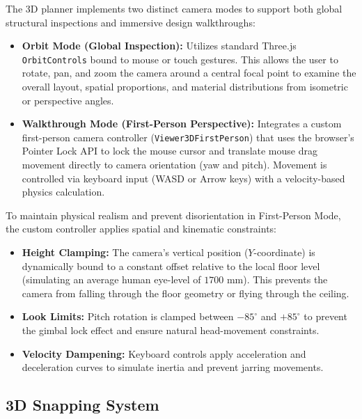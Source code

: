 The 3D planner implements two distinct camera modes to support both global structural inspections and immersive design walkthroughs:
\begin{itemize}
    \item \textbf{Orbit Mode (Global Inspection):} Utilizes standard Three.js \texttt{OrbitControls} bound to mouse or touch gestures. This allows the user to rotate, pan, and zoom the camera around a central focal point to examine the overall layout, spatial proportions, and material distributions from isometric or perspective angles.
    \item \textbf{Walkthrough Mode (First-Person Perspective):} Integrates a custom first-person camera controller (\texttt{Viewer3DFirstPerson}) that uses the browser's Pointer Lock API to lock the mouse cursor and translate mouse drag movement directly to camera orientation (yaw and pitch). Movement is controlled via keyboard input (WASD or Arrow keys) with a velocity-based physics calculation.
\end{itemize}

To maintain physical realism and prevent disorientation in First-Person Mode, the custom controller applies spatial and kinematic constraints:
\begin{itemize}
    \item \textbf{Height Clamping:} The camera's vertical position ($Y$-coordinate) is dynamically bound to a constant offset relative to the local floor level (simulating an average human eye-level of $1700\text{ mm}$). This prevents the camera from falling through the floor geometry or flying through the ceiling.
    \item \textbf{Look Limits:} Pitch rotation is clamped between $-85^\circ$ and $+85^\circ$ to prevent the gimbal lock effect and ensure natural head-movement constraints.
    \item \textbf{Velocity Dampening:} Keyboard controls apply acceleration and deceleration curves to simulate inertia and prevent jarring movements.
\end{itemize}

\subsection{3D Snapping System}
\label{subsec:3d_snapping}

